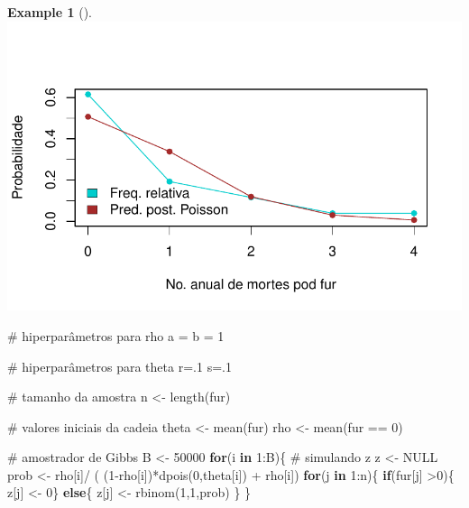 \documentclass[
  letterpaper,
  DIV=11,
  numbers=noendperiod]{scrreprt}
\newenvironment{Shaded}{\begin{snugshade}}{\end{snugshade}}
\newcommand{\CommentTok}[1]{\textcolor[rgb]{0.37,0.37,0.37}{#1}}
\newcommand{\ConstantTok}[1]{\textcolor[rgb]{0.56,0.35,0.01}{#1}}
\newcommand{\ControlFlowTok}[1]{\textcolor[rgb]{0.00,0.23,0.31}{\textbf{#1}}}
\newcommand{\DecValTok}[1]{\textcolor[rgb]{0.68,0.00,0.00}{#1}}
\newcommand{\FunctionTok}[1]{\textcolor[rgb]{0.28,0.35,0.67}{#1}}
\newcommand{\NormalTok}[1]{\textcolor[rgb]{0.00,0.23,0.31}{#1}}
\newcommand{\OtherTok}[1]{\textcolor[rgb]{0.00,0.23,0.31}{#1}}
\newcommand{\SpecialCharTok}[1]{\textcolor[rgb]{0.37,0.37,0.37}{#1}}
\theoremstyle{definition}
\theoremstyle{plain}
\theoremstyle{definition}
\newtheorem{example}{Example}[chapter]
\theoremstyle{remark}
\begin{document}
\begin{example}[]
\includegraphics{misturas_files/figure-pdf/unnamed-chunk-2-1.pdf}

\begin{Shaded}
\begin{Highlighting}[]
\CommentTok{\# hiperparâmetros para rho}
\NormalTok{a }\OtherTok{=}\NormalTok{ b }\OtherTok{=} \DecValTok{1}

\CommentTok{\# hiperparâmetros para theta}
\NormalTok{r}\OtherTok{=}\NormalTok{.}\DecValTok{1}
\NormalTok{s}\OtherTok{=}\NormalTok{.}\DecValTok{1}

\CommentTok{\# tamanho da amostra}
\NormalTok{n }\OtherTok{\textless{}{-}} \FunctionTok{length}\NormalTok{(fur) }

\CommentTok{\# valores iniciais da cadeia}
\NormalTok{theta }\OtherTok{\textless{}{-}} \FunctionTok{mean}\NormalTok{(fur)}
\NormalTok{rho }\OtherTok{\textless{}{-}} \FunctionTok{mean}\NormalTok{(fur }\SpecialCharTok{==} \DecValTok{0}\NormalTok{)}

\CommentTok{\# amostrador de Gibbs}
\NormalTok{B }\OtherTok{\textless{}{-}} \DecValTok{50000}
\ControlFlowTok{for}\NormalTok{(i }\ControlFlowTok{in} \DecValTok{1}\SpecialCharTok{:}\NormalTok{B)\{}
  \CommentTok{\# simulando z}
\NormalTok{  z }\OtherTok{\textless{}{-}} \ConstantTok{NULL}
\NormalTok{  prob }\OtherTok{\textless{}{-}}\NormalTok{ rho[i]}\SpecialCharTok{/}\NormalTok{ ( (}\DecValTok{1}\SpecialCharTok{{-}}\NormalTok{rho[i])}\SpecialCharTok{*}\FunctionTok{dpois}\NormalTok{(}\DecValTok{0}\NormalTok{,theta[i]) }\SpecialCharTok{+}\NormalTok{ rho[i])}
  \ControlFlowTok{for}\NormalTok{(j }\ControlFlowTok{in} \DecValTok{1}\SpecialCharTok{:}\NormalTok{n)\{}
    \ControlFlowTok{if}\NormalTok{(fur[j] }\SpecialCharTok{\textgreater{}}\DecValTok{0}\NormalTok{)\{ z[j] }\OtherTok{\textless{}{-}} \DecValTok{0}\NormalTok{\} }\ControlFlowTok{else}\NormalTok{\{}
\NormalTok{      z[j] }\OtherTok{\textless{}{-}} \FunctionTok{rbinom}\NormalTok{(}\DecValTok{1}\NormalTok{,}\DecValTok{1}\NormalTok{,prob)}
\NormalTok{    \}}
\NormalTok{  \}}


\end{Highlighting}
\end{Shaded}
\end{example}
\end{document}
